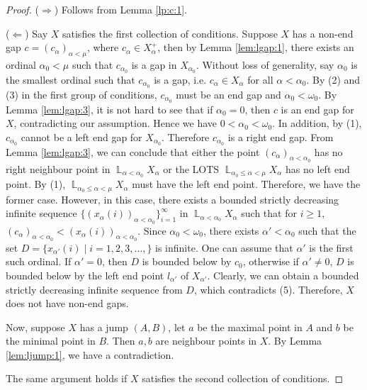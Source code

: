 \documentclass[12pt,oneside,english]{amsbook}
\numberwithin{equation}{section} %
\numberwithin{figure}{section} %
\theoremstyle{plain}
\numberwithin{section}{chapter}
\theoremstyle{plain}
\DeclareMathOperator{\LP}{\mathbb{L}}
\begin{document}
\begin{proof}
  ($\Rightarrow$) Follows from Lemma \ref{lp:c:1}.

  ($\Leftarrow$) Say $X$ satisfies the first collection of conditions. Suppose $X$ has a non-end gap $c = (c_{\alpha})_{\alpha < \mu}$, where $c_{\alpha} \in X_{\alpha}^+$, then by Lemma  \ref{lem:lgap:1}, there exists an ordinal $\alpha_0 < \mu$ such that $c_{\alpha_0}$ is a gap in $X_{\alpha_0}$. Without loss of generality, say $\alpha_0$ is the smallest ordinal such that $c_{\alpha_0}$ is a gap, i.e. $c_{\alpha} \in X_{\alpha}$ for all $\alpha < \alpha_0$. By (2) and (3) in the first group of conditions, $c_{\alpha_0}$ must be an end gap and $\alpha_0 < \omega_0$. By Lemma \ref{lem:lgap:3}, it is not hard to see that if $\alpha_0 = 0$, then $c$ is an end gap for $X$, contradicting our assumption. Hence we have $0 < \alpha_0 < \omega_0$. In addition, by (1), $c_{\alpha_0}$ cannot be a left end gap for $X_{\alpha_0}$. Therefore $c_{\alpha_0}$ is a right end gap. From Lemma \ref{lem:lgap:3}, we can conclude that either the point $(c_{\alpha})_{\alpha < \alpha_0}$ has no right neighbour point in $\LP_{\alpha < \alpha_0}X_{\alpha}$ or the LOTS $\LP_{\alpha_0 \leq \alpha < \mu}X_{\alpha}$ has no left end point. By (1), $\LP_{\alpha_0 \leq \alpha < \mu}X_{\alpha}$ must have the left end point. Therefore, we have the former case. However, in this case, there exists a bounded strictly decreasing infinite sequence $\{(x_{\alpha}(i))_{\alpha < \alpha_0}\}_{i = 1}^{\infty}$ in $\LP_{\alpha < \alpha_0}X_{\alpha}$ such that for $i \geq 1$, $(c_{\alpha})_{\alpha < \alpha_0} < (x_{\alpha}(i))_{\alpha < \alpha_0}$. Since $\alpha_0 < \omega_0$, there exists $\alpha' < \alpha_0$ such that the set $D = \{x_{\alpha'}(i) \; | \; i = 1,2,3, \ldots ,\}$ is infinite. One can assume that $\alpha'$ is the first such ordinal. If $\alpha' = 0$, then $D$ is bounded below by $c_0$, otherwise if $\alpha' \neq 0$, $D$ is bounded below by the left end point $l_{\alpha'}$ of $X_{\alpha'}$. Clearly, we can obtain a bounded strictly decreasing infinite sequence from $D$, which contradicts (5). Therefore, $X$ does not have non-end gaps.

  Now, suppose $X$ has a jump $(A,B)$, let $a$ be the maximal point in $A$ and $b$ be the minimal point in $B$. Then $a,b$ are neighbour points in $X$. By Lemma \ref{lem:ljump:1}, we have a contradiction.

  The same argument holds if $X$ satisfies the second collection of conditions.
\end{proof}
\end{document}
